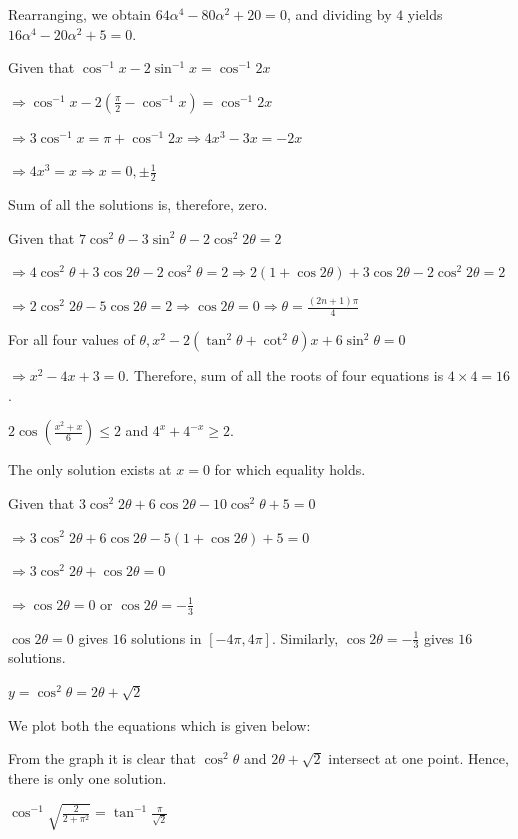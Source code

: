   Rearranging, we obtain
  $64\alpha^4-80\alpha^2+20=0$, and dividing by $4$ yields
  $16\alpha^4-20\alpha^2+5=0$.
\item Given that $\cos^{-1}x - 2\sin^{-1}x = \cos^{-1}2x$

  $\Rightarrow \cos^{-1}x - 2\left(\frac{\pi}{2} - \cos^{-1}x\right) = \cos^{-1}2x$

  $\Rightarrow 3\cos^{-1}x = \pi + \cos^{-1}2x\Rightarrow 4x^3 - 3x = -2x$

  $\Rightarrow 4x^3 = x\Rightarrow x = 0, \pm\frac{1}{2}$

  Sum of all the solutions is, therefore, zero.
\item Given that $7\cos^{2}\theta - 3\sin^{2}\theta - 2\cos^{2}2\theta = 2$

  $\Rightarrow 4\cos^2\theta + 3\cos2\theta - 2\cos^{2}\theta = 2 \Rightarrow 2(1 + \cos2\theta) +
  3\cos2\theta - 2\cos^{2}2\theta = 2$

  $\Rightarrow 2\cos^{2}2\theta - 5\cos2\theta = 2\Rightarrow \cos2\theta = 0 \Rightarrow \theta = \frac{(2n
    + 1)\pi}{4}$

  For all four values of $\theta, x^{2} - 2\left(\tan^{2}\theta + \cot^{2}\theta\right)x + 6\sin^{2}\theta =
  0$

  $\Rightarrow x^2 - 4x + 3 = 0$. Therefore, sum of all the roots of four equations is $4\times4 = 16$.
\item $2\cos\left(\frac{x^2 + x}{6}\right)\le 2$ and $4^x + 4^{-x} \ge 2$.

  The only solution exists at $x = 0$ for which equality holds.
\item Given that $3\cos^{2}2\theta + 6\cos2\theta - 10\cos^{2}\theta + 5 = 0$

  $\Rightarrow 3\cos^{2}2\theta + 6\cos2\theta - 5(1 + \cos2\theta) + 5 = 0$

  $\Rightarrow 3\cos^{2}2\theta + \cos2\theta = 0$

  $\Rightarrow \cos2\theta = 0$ or $\cos2\theta = -\frac{1}{3}$

  $\cos2\theta = 0$ gives $16$ solutions in $[-4\pi, 4\pi]$. Similarly, $\cos2\theta = -\frac{1}{3}$ gives
  $16$ solutions.
\item $y = \cos^{2}\theta = 2\theta + \sqrt{2}$

  We plot both the equations which is given below:

  \startplacefigure
    \externalfigure[17_27.pdf]
  \stopplacefigure

  From the graph it is clear that $\cos^2\theta$ and $2\theta + \sqrt{2}$ intersect at one point. Hence,
  there is only one solution.
\item $\cos^{-1}\sqrt{\frac{2}{2 + \pi^{2}}} = \tan^{-1}\frac{\pi}{\sqrt{2}}$

